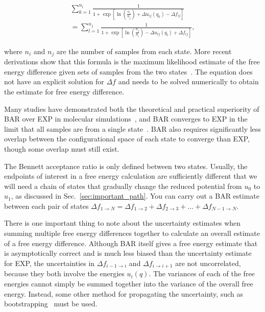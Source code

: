 \begin{eqnarray}
 \sum_{k=1}^{n_i} \frac{1}{1 + \exp[\ln(\frac{n_i}{n_j}) + \Delta u_{ij}(q_k) - \Delta f_{ij}
 ]} \nonumber \\
 =\sum_{l=1}^{n_j} \frac{1}{1 + \exp[\ln(\frac{n_j}{n_i}) - \Delta u_{ij}(q_l) + \Delta f_{ij}]}, \label{eq:bar}
\end{eqnarray}

where $n_i$ and $n_j$ are the number of samples from each state. More recent derivations show that this formula is the maximum likelihood estimate of the free energy difference given sets of samples from the two states~\cite{shirts2003equilibrium}. 
The equation does not have an explicit solution for $\Delta f$ and needs to be solved numerically to obtain the estimate for free energy difference.

Many studies have demonstrated both the theoretical and practical superiority of BAR over EXP in molecular
simulations~\cite{shirts2005comparison,lu2003appropriate}, and BAR converges to EXP in the limit that all samples are from a single state~\cite{bennett1976efficient,bennett1976efficient,shirts2003equilibrium}. BAR also requires significantly less overlap between the configurational space of each state to converge than EXP, though some overlap must still exist.

The Bennett acceptance ratio is only defined between two states. Usually, the endpoints of interest in a free energy calculation are sufficiently different that we will need a chain of states that gradually change the reduced potential from $u_0$ to $u_1$, as discussed in Sec.~\ref{sec:important_path}. You can carry out a BAR estimate between each pair of states $\Delta f_{1 \rightarrow N} = \Delta {f_{1\rightarrow 2}} + \Delta {f_{2\rightarrow 3}} +  \ldots + \Delta f_{N-1\rightarrow N}$.

There is one important thing to note about the uncertainty estimates when summing multiple free energy differences together to calculate an overall estimate of a free energy difference. Although BAR itself gives a free energy estimate that is asymptotically correct and is much less biased than the uncertainty estimate for EXP, the uncertainties in $\Delta {f_{i-1\rightarrow i}}$ and $\Delta {f_{i\rightarrow i+1}}$ are not uncorrelated, because they both involve the energies $u_i(q)$. The variances of each of the free energies cannot simply be summed together into the variance of the overall free energy. Instead, some other method for propagating the uncertainty, such as bootstrapping~\cite{grossfield2018best} must be used.

